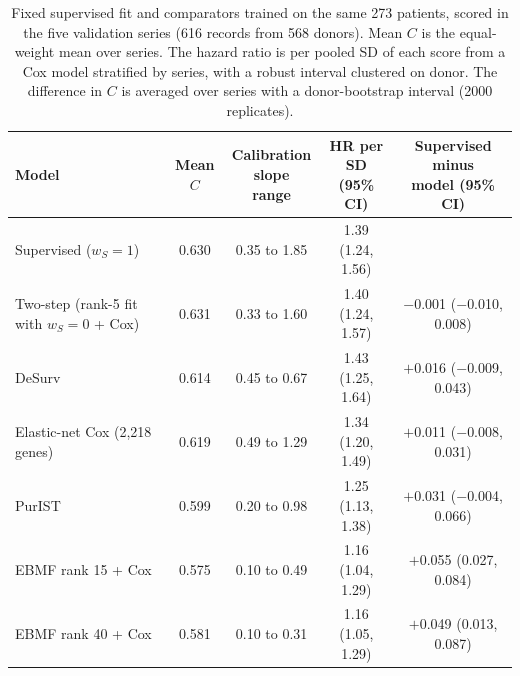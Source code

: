 \begin{table}[!htb]
\centering
\small
\setlength{\tabcolsep}{3pt}
\begin{tabular}{lcccc}
\toprule
Model & Mean $C$ & \shortstack{Calibration\\slope range} & \shortstack{HR per SD\\(95\% CI)} & \shortstack{Supervised minus\\model (95\% CI)} \\
\midrule
Supervised ($w_S = 1$) & 0.630 & 0.35 to 1.85 & 1.39 (1.24, 1.56) &  \\
Two-step (rank-5 fit with $w_S = 0$ + Cox) & 0.631 & 0.33 to 1.60 & 1.40 (1.24, 1.57) & $-$0.001 ($-$0.010, 0.008) \\
DeSurv & 0.614 & 0.45 to 0.67 & 1.43 (1.25, 1.64) & $+$0.016 ($-$0.009, 0.043) \\
Elastic-net Cox (2,218 genes) & 0.619 & 0.49 to 1.29 & 1.34 (1.20, 1.49) & $+$0.011 ($-$0.008, 0.031) \\
PurIST & 0.599 & 0.20 to 0.98 & 1.25 (1.13, 1.38) & $+$0.031 ($-$0.004, 0.066) \\
EBMF rank 15 + Cox & 0.575 & 0.10 to 0.49 & 1.16 (1.04, 1.29) & $+$0.055 (0.027, 0.084) \\
EBMF rank 40 + Cox & 0.581 & 0.10 to 0.31 & 1.16 (1.05, 1.29) & $+$0.049 (0.013, 0.087) \\
\bottomrule
\end{tabular}
\caption{Fixed supervised fit and comparators trained on the same 273 patients, scored in the five validation series (616 records from 568 donors). Mean $C$ is the equal-weight mean over series. The hazard ratio is per pooled SD of each score from a Cox model stratified by series, with a robust interval clustered on donor. The difference in $C$ is averaged over series with a donor-bootstrap interval (2000 replicates).}
\label{tab:comparators}
\end{table}
